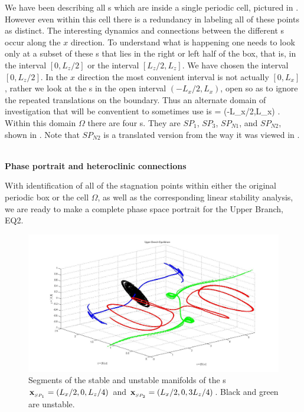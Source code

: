 \documentclass[letter,10pt,openany]{article}
\begin{document}
   We have been describing all \stagp s which are
   inside a single periodic cell, pictured in . However even within this cell
   there is a redundancy in labeling all of these points as
   distinct. 
   The interesting dynamics and connections between the different \stagp s occur
 along the $x$ direction. To understand what is happening one needs
 to look only at a subset of these \stagp s that lies in the right or left half of the box, that
 is, in the interval $[0,L_{z}/2]$ or the interval $[L_{z}/2,L_{z}]$. We have chosen
 the interval $[0,L_{z}/2]$. In
 the $x$ direction the most convenient interval is not actually
 $[0,L_{x}]$, rather we look at the \stagp s in the open interval
 $(-L_{x}/2,L_{x})$, open so as to ignore the repeated translations on the boundary. Thus an alternate domain of investigation that will be conventient to sometimes use is
 \beq \Omega = (-L_{x}/2,L_{x}) \times [-1,1] \times [0,L_{z}/2].
 \eeq
 Within this domain $\Omega$ there are four \stagp s. They are $SP_1$, $SP_3$, $SP_{N1}$, and
 $SP_{N2}$, shown in
  . Note that $SP_{N2}$ is a
 translated version from the way it was viewed in
 .  \\ \\
   
   

\begin{large}
\noindent \textbf{Phase portrait and heteroclinic connections} \\
\end{large}

With identification of all of the stagnation points within either the original periodic box or the cell $\Omega$, as well as the corresponding linear stability analysis, we are ready to make a complete phase space portrait for the Upper Branch, EQ2. \\

\begin{figure}[!h]
\includegraphics[width=1.1\textwidth]{manifolds_both.jpg}
  \caption{
   Segments of the stable and unstable manifolds of the \stagp s
   $\bold{x}_{_{SP_{1}}} = (L_x/2,0,L_z/4)$ and
   $\bold{x}_{_{SP_{2}}} = (L_x/2,0,3L_z/4)$. Black and green are unstable.
   }
  \label{eltonFig:manifolds_both}
 \end{figure}
\end{document}
